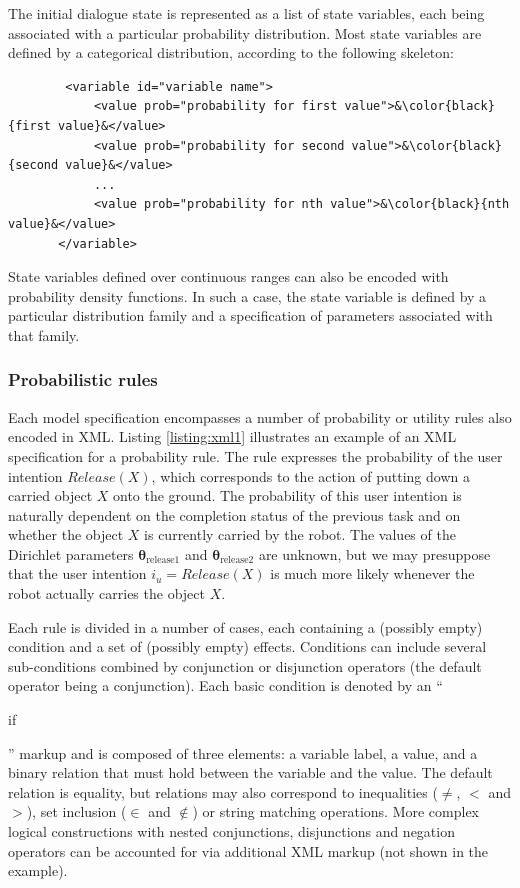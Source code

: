 The initial dialogue state is represented as a list of state variables, each being associated with a particular probability distribution.  Most state variables are defined by a categorical distribution, according to the following skeleton:

\vspace{3mm}\begin{lstlisting}
        <variable id="variable name">
            <value prob="probability for first value">&\color{black}{first value}&</value>
            <value prob="probability for second value">&\color{black}{second value}&</value>
            ...
            <value prob="probability for nth value">&\color{black}{nth value}&</value>
       </variable>  
\end{lstlisting}\vspace{2mm}

State variables defined over continuous ranges can also be encoded with probability density functions. In such a case, the state variable is defined by a particular distribution family and a specification of parameters associated with that family. 

\subsubsection*{Probabilistic rules}

Each model specification encompasses a number of probability or utility rules also encoded in XML. Listing \ref{listing:xml1} illustrates an example of an XML specification for a probability rule. The rule expresses the probability of the user intention $\mathit{Release}(X)$, which corresponds to the action of putting down a carried object $X$ onto the ground.  The probability of this user intention is naturally dependent on the completion status of the previous task and on whether the object $X$ is currently carried by the robot. The values of the Dirichlet parameters $\boldsymbol\theta_{\text{release1}}$ and $\boldsymbol\theta_{\text{release2}}$ are unknown, but we may presuppose that the user intention $i_u = \mathit{Release}(X)$ is much more likely whenever the robot actually carries the object $X$. 

Each rule is divided in a number of cases, each containing a (possibly empty) condition and a set of (possibly empty) effects.  Conditions can include several sub-conditions combined by conjunction or disjunction operators (the default operator being a conjunction). Each basic condition is denoted by an ``\begin{small}\textsf{if}\end{small}'' markup and is composed of three elements: a variable label, a value, and a binary relation that must hold between the variable and the value. The default relation is equality, but relations may also correspond to inequalities ($\neq$, $<$ and $>$), set inclusion ($\in$ and $\notin$) or string matching operations.   More complex logical constructions with nested conjunctions, disjunctions and negation operators can be accounted for via additional XML markup (not shown in the example). 

